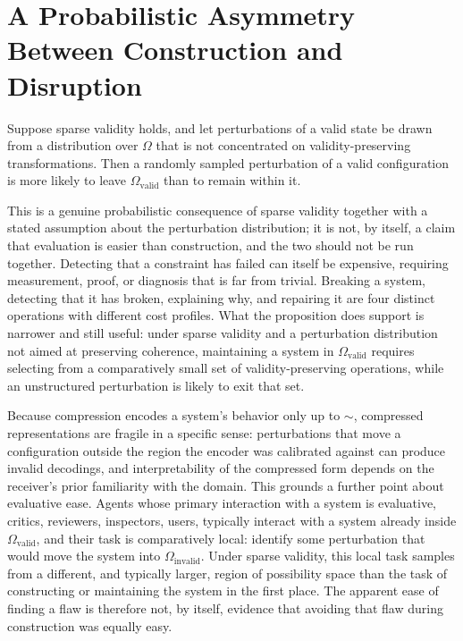 \section{A Probabilistic Asymmetry Between Construction and Disruption}

\begin{proposition}
\label{prop:asymmetry}
Suppose sparse validity holds, and let perturbations of a valid state be drawn from a distribution over $\Omega$ that is not concentrated on validity-preserving transformations. Then a randomly sampled perturbation of a valid configuration is more likely to leave $\Omega_{\mathrm{valid}}$ than to remain within it.
\end{proposition}

This is a genuine probabilistic consequence of sparse validity together with a stated assumption about the perturbation distribution; it is not, by itself, a claim that evaluation is easier than construction, and the two should not be run together. Detecting that a constraint has failed can itself be expensive, requiring measurement, proof, or diagnosis that is far from trivial. Breaking a system, detecting that it has broken, explaining why, and repairing it are four distinct operations with different cost profiles. What the proposition does support is narrower and still useful: under sparse validity and a perturbation distribution not aimed at preserving coherence, maintaining a system in $\Omega_{\mathrm{valid}}$ requires selecting from a comparatively small set of validity-preserving operations, while an unstructured perturbation is likely to exit that set.

Because compression encodes a system's behavior only up to $\sim$, compressed representations are fragile in a specific sense: perturbations that move a configuration outside the region the encoder was calibrated against can produce invalid decodings, and interpretability of the compressed form depends on the receiver's prior familiarity with the domain. This grounds a further point about evaluative ease. Agents whose primary interaction with a system is evaluative, critics, reviewers, inspectors, users, typically interact with a system already inside $\Omega_{\mathrm{valid}}$, and their task is comparatively local: identify some perturbation that would move the system into $\Omega_{\mathrm{invalid}}$. Under sparse validity, this local task samples from a different, and typically larger, region of possibility space than the task of constructing or maintaining the system in the first place. The apparent ease of finding a flaw is therefore not, by itself, evidence that avoiding that flaw during construction was equally easy.

